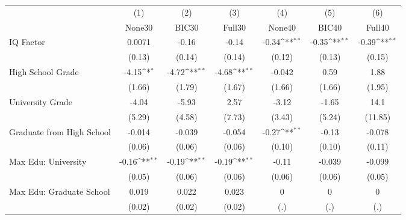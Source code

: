 {
\def\sym#1{\ifmmode^{#1}\else\(^{#1}\)\fi}
\begin{tabular}{l*{6}{c}}
\toprule
            &\multicolumn{1}{c}{(1)}&\multicolumn{1}{c}{(2)}&\multicolumn{1}{c}{(3)}&\multicolumn{1}{c}{(4)}&\multicolumn{1}{c}{(5)}&\multicolumn{1}{c}{(6)}\\
            &\multicolumn{1}{c}{None30}&\multicolumn{1}{c}{BIC30}&\multicolumn{1}{c}{Full30}&\multicolumn{1}{c}{None40}&\multicolumn{1}{c}{BIC40}&\multicolumn{1}{c}{Full40}\\
\midrule
IQ Factor   &      0.0071         &       -0.16         &       -0.14         &       -0.34\sym{**} &       -0.35\sym{**} &       -0.39\sym{**} \\
            &      (0.13)         &      (0.14)         &      (0.14)         &      (0.12)         &      (0.13)         &      (0.15)         \\
\addlinespace
High School Grade&       -4.15\sym{*}  &       -4.72\sym{**} &       -4.68\sym{**} &      -0.042         &        0.59         &        1.88         \\
            &      (1.66)         &      (1.79)         &      (1.67)         &      (1.66)         &      (1.66)         &      (1.95)         \\
\addlinespace
University Grade&       -4.04         &       -5.93         &        2.57         &       -3.12         &       -1.65         &        14.1         \\
            &      (5.29)         &      (4.58)         &      (7.73)         &      (3.43)         &      (5.24)         &     (11.85)         \\
\addlinespace
Graduate from High School&      -0.014         &      -0.039         &      -0.054         &       -0.27\sym{**} &       -0.13         &      -0.078         \\
            &      (0.06)         &      (0.06)         &      (0.06)         &      (0.10)         &      (0.10)         &      (0.11)         \\
\addlinespace
Max Edu: University&       -0.16\sym{**} &       -0.19\sym{**} &       -0.19\sym{**} &       -0.11         &      -0.039         &      -0.099         \\
            &      (0.05)         &      (0.06)         &      (0.06)         &      (0.06)         &      (0.06)         &      (0.05)         \\
\addlinespace
Max Edu: Graduate School&       0.019         &       0.022         &       0.023         &           0         &           0         &           0         \\
            &      (0.02)         &      (0.02)         &      (0.02)         &         (.)         &         (.)         &         (.)         \\
\bottomrule
\end{tabular}
}
